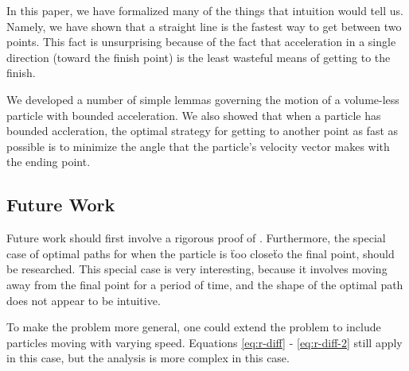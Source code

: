 In this paper, we have formalized many of the things that intuition would tell us. Namely, we have shown that a straight line is the fastest way to get between two points. This fact is unsurprising because of the fact that acceleration in a single direction (toward the finish point) is the least wasteful means of getting to the finish.

We developed a number of simple lemmas governing the motion of a volume-less particle with bounded acceleration. We also showed that when a particle has bounded accleration, the optimal strategy for getting to another point as fast as possible is to minimize the angle that the particle's velocity vector makes with the ending point.

\subsection{Future Work}

Future work should first involve a rigorous proof of . Furthermore, the special case of optimal paths for when the particle is \"too close\" to the final point, should be researched. This special case is very interesting, because it involves moving away from the final point for a period of time, and the shape of the optimal path does not appear to be intuitive.

To make the problem more general, one could extend the problem to include particles moving with varying speed. Equations \ref{eq:r-diff} - \ref{eq:r-diff-2} still apply in this case, but the analysis is more complex in this case. 
